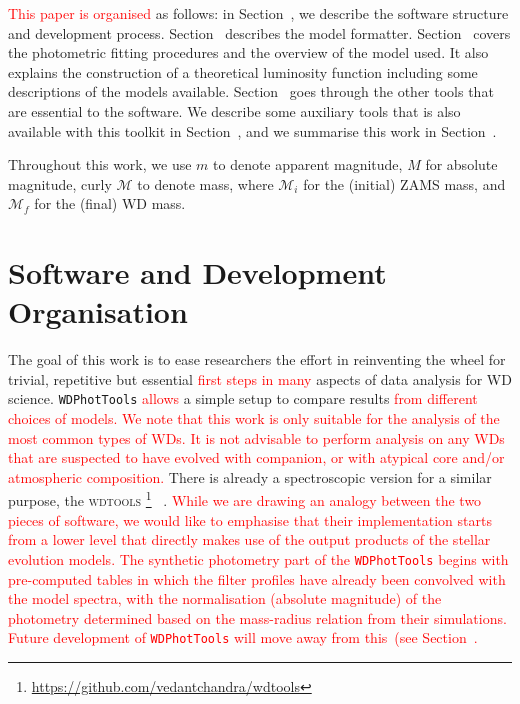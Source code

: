 \documentclass[fleqn,usenatbib]{rasti}
\begin{document}
\textcolor{red}{This paper is organised} as follows: in Section~, we describe
the software structure and development process. Section~ describes
the model formatter. Section~ covers the photometric fitting
procedures and the overview of the model used. It also explains the
construction of a theoretical luminosity function including some descriptions
of the models available. Section~ goes through the other tools
that are essential to the software. We describe some auxiliary tools that is
also available with this toolkit in Section~, and we summarise this
work in Section~.

Throughout this work, we use $m$ to denote apparent magnitude, $M$ for
absolute magnitude, curly $\mathcal{M}$ to denote mass, where $\mathcal{M}_i$
for the (initial) ZAMS mass, and $\mathcal{M}_f$ for the (final) WD mass.

\section{Software and Development Organisation}
The goal of this work is to ease researchers the effort in reinventing the
wheel for trivial, repetitive but essential \textcolor{red}{first \textcolor{red}{steps} in many}
aspects of data analysis for WD science. \texttt{WDPhotTools} \textcolor{red}{allows} a simple
setup to compare results \textcolor{red}{from different choices of models. We note that this work is only suitable for the analysis of the
most common types of WDs. It is not advisable to perform analysis on any WDs
that are suspected to have evolved with companion, or with atypical core
and/or atmospheric composition.}
There is already a spectroscopic version for a similar purpose, the
\textsc{wdtools} \footnote{\url{https://github.com/vedantchandra/wdtools}}~
\citep{2020MNRAS.497.2688C}. \textcolor{red}{While we are drawing
an analogy between the two pieces of software, we would like to emphasise that their
implementation starts from a lower level that directly makes use of the
output products of the stellar evolution models. The synthetic
photometry part of the \texttt{WDPhotTools} begins with pre-computed
tables in which the filter profiles have already been convolved with the model
spectra, with the normalisation (absolute magnitude) of the photometry
determined based on the mass-radius relation from their simulations. Future
development of \texttt{WDPhotTools} will move away from this~(see
Section~.}
\end{document}
